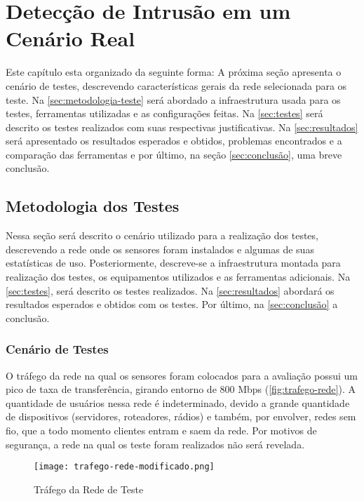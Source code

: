 \chapter{Detecção de Intrusão em um Cenário Real} \label{ch:cenário-real}

Este capítulo esta organizado da seguinte forma: A próxima seção apresenta o cenário de testes, descrevendo características gerais da rede selecionada para os teste. Na \autoref{sec:metodologia-teste} será abordado a infraestrutura usada para os testes, ferramentas utilizadas e as configurações feitas. Na \autoref{sec:testes} será descrito os testes realizados com suas respectivas justificativas. Na \autoref{sec:resultados} será apresentado os resultados esperados e obtidos, problemas encontrados e a comparação das ferramentas e por último, na seção \autoref{sec:conclusão}, uma breve conclusão.

\section{Metodologia dos Testes} \label{sec:metodologia-teste}

Nessa seção será descrito o cenário utilizado para a realização dos testes, descrevendo a rede onde os sensores foram instalados e algumas de suas estatísticas de uso. Posteriormente, descreve-se a infraestrutura montada para realização dos testes, os equipamentos utilizados e as ferramentas adicionais. Na \autoref{sec:testes}, será descrito os testes realizados. Na \autoref{sec:resultados} abordará os resultados esperados e obtidos com os testes. Por último, na \autoref{sec:conclusão} a conclusão.

\subsection{Cenário de Testes} \label{sec:cenário}

O tráfego da rede na qual os sensores foram colocados para a avaliação possui um pico de taxa de transferência, girando entorno de 800 Mbps (\autoref{fig:trafego-rede}). A quantidade de usuários nessa rede é indeterminado, devido a grande quantidade de dispositivos (servidores, roteadores, rádios) e também, por envolver, redes sem fio, que a todo momento clientes entram e saem da rede. Por motivos de segurança, a rede na qual os teste foram realizados não será revelada.

\begin{figure}[!htb]
\centering
\caption{Tráfego da Rede de Teste}
\texttt{[image: trafego-rede-modificado.png]}
\label{fig:trafego-rede}
\end{figure}

